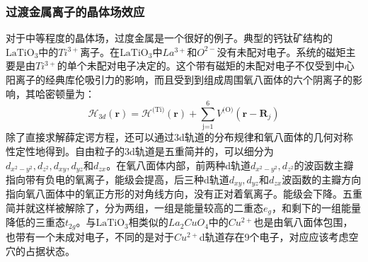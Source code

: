 \subsubsection{过渡金属离子的晶体场效应}
对于中等程度的晶体场，过度金属是一个很好的例子。典型的钙钛矿结构的$\text{LaTiO}_{3}$中的$Ti^{3+}$离子。在$\text{LaTiO}_{3}$中$La^{3+}\text{和}O^{2-}$没有未配对电子。系统的磁矩主要是由$Ti^{3+}$的单个未配对电子决定的。这个带有磁矩的未配对电子不仅受到中心阳离子的经典库伦吸引力的影响，而且受到到组成周围氧八面体的六个阴离子的影响，其哈密顿量为：
\begin{equation}
    \mathcal{H}_{3d}(\bm{r})=\mathcal{H}^{\text{(Ti)}}(\bm{r})+\sum^{6}_{\text{j=1}}V^{\text{(O)}}(\bm{r}-\bm{R}_{j})
\end{equation}
除了直接求解薛定谔方程，还可以通过3d轨道的分布规律和氧八面体的几何对称性定性地得到。自由粒子的3d轨道是五重简并的，可以细分为$d_{x^{2}-y^{2}},d_{z^{2}},d_{xy},d_{yz}\text{和}d_{zx}$。在氧八面体内部，前两种d轨道$d_{x^{2}-y^{2}},d_{z^{2}}$的波函数主瓣指向带有负电的氧离子，能级会提高，后三种d轨道$d_{xy},d_{yz}\text{和}d_{zx}$波函数的主瓣方向指向氧八面体中的氧正方形的对角线方向，没有正对着氧离子。能级会下降。五重简并就这样被解除了，分为两组，一组是能量较高的二重态$e_{g}$，和剩下的一组能量降低的三重态$t_{2g}$。与$\text{LaTiO}_{3}$相类似的$La_{2}CuO_{4}$中的$Cu^{2+}$也是由氧八面体包围，也带有一个未成对电子，不同的是对于$Cu^{2+}$d轨道存在9个电子，对应应该考虑空穴的占据状态。


